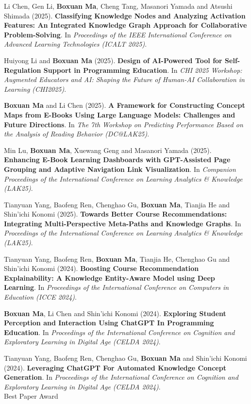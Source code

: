 \documentclass[a4paper,11pt]{article}
\begin{document}
\item[\textbf{[C.23]}] Li Chen, Gen Li, \textbf{Boxuan Ma}, Cheng Tang, Masanori Yamada and Atsushi Shimada (2025). \textbf{Classifying Knowledge Nodes and Analyzing Activation Features: An Integrated Knowledge Graph Approach for Collaborative Problem-Solving}. In \textit{Proceedings of the IEEE International Conference on Advanced Learning Technologies (ICALT 2025)}.
\item[\textbf{[C.22]}] Huiyong Li and \textbf{Boxuan Ma} (2025). \textbf{Design of AI-Powered Tool for Self-Regulation Support in Programming Education}. In \textit{CHI 2025 Workshop: Augmented Educators and AI: Shaping the Future of Human-AI Collaboration in Learning (CHI2025)}.
\item[\textbf{[C.21]}] \textbf{Boxuan Ma} and Li Chen (2025). \textbf{A Framework for Constructing Concept Maps from E-Books Using Large Language Models: Challenges and Future Directions}. In \textit{The 7th Workshop on Predicting Performance Based on the Analysis of Reading Behavior (DC@LAK25)}.
\item[\textbf{[C.20]}] Min Lu, \textbf{Boxuan Ma}, Xuewang Geng and Masanori Yamada (2025). \textbf{Enhancing E-Book Learning Dashboards with GPT-Assisted Page Grouping and Adaptive Navigation Link Visualization}. In \textit{Companion Proceedings of the International Conference on Learning Analytics \& Knowledge (LAK25)}.
\item[\textbf{[C.19]}] Tianyuan Yang, Baofeng Ren, Chenghao Gu, \textbf{Boxuan Ma}, Tianjia He and Shin'ichi Konomi (2025). \textbf{Towards Better Course Recommendations: Integrating Multi-Perspective Meta-Paths and Knowledge Graphs}. In \textit{Proceedings of the International Conference on Learning Analytics \& Knowledge (LAK25)}.
\item[\textbf{[C.18]}] Tianyuan Yang, Baofeng Ren, \textbf{Boxuan Ma}, Tianjia He, Chenghao Gu and Shin'ichi Konomi (2024). \textbf{Boosting Course Recommendation Explainability: A Knowledge Entity-Aware Model using Deep Learning}. In \textit{Proceedings of the International Conference on Computers in Education (ICCE 2024)}.
\item[\textbf{[C.17]}] \textbf{Boxuan Ma}, Li Chen and Shin'ichi Konomi (2024). \textbf{Exploring Student Perception and Interaction Using ChatGPT In Programming Education}. In \textit{Proceedings of the International Conference on Cognition and Exploratory Learning in Digital Age (CELDA 2024)}.
\item[\textbf{[C.16]}] Tianyuan Yang, Baofeng Ren, Chenghao Gu, \textbf{Boxuan Ma} and Shin'ichi Konomi (2024). \textbf{Leveraging ChatGPT For Automated Knowledge Concept Generation}. In \textit{Proceedings of the International Conference on Cognition and Exploratory Learning in Digital Age (CELDA 2024)}. \\ \textcolor{red!80!black}{Best Paper Award}
\end{document}
